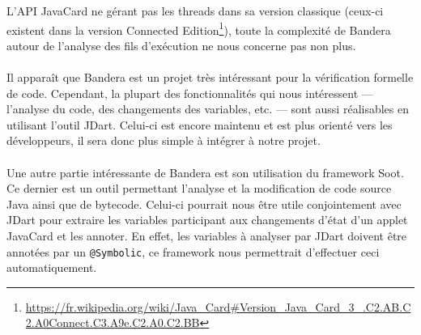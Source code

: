 L'API JavaCard ne gérant pas les threads dans sa version
classique (ceux-ci existent dans la version Connected
Edition\footnote{\url{https://fr.wikipedia.org/wiki/Java_Card\#Version_Java_Card_3_.C2.AB.C2.A0Connect.C3.A9e.C2.A0.C2.BB}}),
toute la complexité de Bandera autour de l'analyse des fils
d'exécution ne nous concerne pas non plus.

\paragraph{}
Il apparaît que Bandera est un projet très intéressant pour la
vérification formelle de code. Cependant, la plupart des
fonctionnalités qui nous intéressent --- l'analyse du code, des
changements des variables, etc. --- sont aussi réalisables en
utilisant l'outil JDart. Celui-ci est encore maintenu et est plus orienté vers les
développeurs, il sera donc plus simple à intégrer à notre projet.

\paragraph{}
Une autre partie intéressante de Bandera est son utilisation du
framework Soot. Ce dernier est un outil permettant l'analyse et la
modification de code source Java ainsi que de bytecode. Celui-ci
pourrait nous être utile conjointement avec JDart pour extraire les
variables participant aux changements d'état d'un applet JavaCard et
les annoter. En effet, les variables à analyser par JDart doivent être
annotées par un \verb|@Symbolic|, ce framework nous permettrait
d'effectuer ceci automatiquement.
